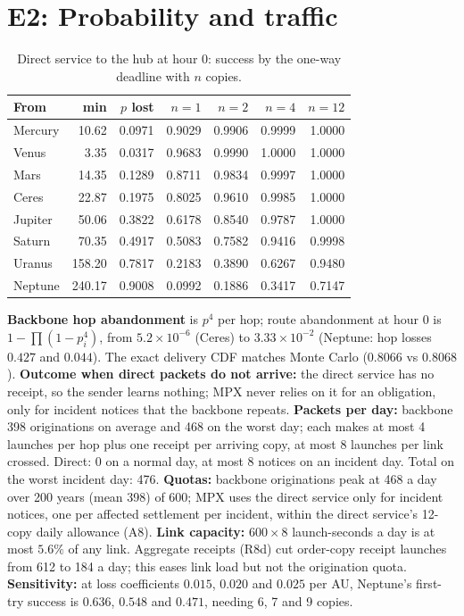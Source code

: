 \documentclass[11pt]{article}
\theoremstyle{definition}
\theoremstyle{remark}
\begin{document}
\section{E2: Probability and traffic}\label{app:e2}
\begin{table}[H]
\centering
\caption{Direct service to the hub at hour 0: success by the one-way deadline with $n$ copies.}
\small
\begin{tabular}{@{}lrrrrrr@{}}
\toprule
From & min & $p$ lost & $n{=}1$ & $n{=}2$ & $n{=}4$ & $n{=}12$ \\
\midrule
Mercury & 10.62 & 0.0971 & 0.9029 & 0.9906 & 0.9999 & 1.0000 \\
Venus & 3.35 & 0.0317 & 0.9683 & 0.9990 & 1.0000 & 1.0000 \\
Mars & 14.35 & 0.1289 & 0.8711 & 0.9834 & 0.9997 & 1.0000 \\
Ceres & 22.87 & 0.1975 & 0.8025 & 0.9610 & 0.9985 & 1.0000 \\
Jupiter & 50.06 & 0.3822 & 0.6178 & 0.8540 & 0.9787 & 1.0000 \\
Saturn & 70.35 & 0.4917 & 0.5083 & 0.7582 & 0.9416 & 0.9998 \\
Uranus & 158.20 & 0.7817 & 0.2183 & 0.3890 & 0.6267 & 0.9480 \\
Neptune & 240.17 & 0.9008 & 0.0992 & 0.1886 & 0.3417 & 0.7147 \\
\bottomrule
\end{tabular}
\end{table}
\textbf{Backbone hop abandonment} is $p^4$ per hop; route abandonment at hour 0 is $1-\prod(1-p_i^4)$, from $5.2\times10^{-6}$ (Ceres) to $3.33\times10^{-2}$ (Neptune: hop losses $0.427$ and $0.044$). The exact delivery CDF matches Monte Carlo ($0.8066$ vs $0.8068$). \textbf{Outcome when direct packets do not arrive:} the direct service has no receipt, so the sender learns nothing; MPX never relies on it for an obligation, only for incident notices that the backbone repeats. \textbf{Packets per day:} backbone 398 originations on average and 468 on the worst day; each makes at most 4 launches per hop plus one receipt per arriving copy, at most 8 launches per link crossed. Direct: 0 on a normal day, at most 8 notices on an incident day. Total on the worst incident day: 476. \textbf{Quotas:} backbone originations peak at 468 a day over 200 years (mean 398) of 600; MPX uses the direct service only for incident notices, one per affected settlement per incident, within the direct service's 12-copy daily allowance (A8). \textbf{Link capacity:} $600\times8$ launch-seconds a day is at most $5.6\%$ of any link. Aggregate receipts (R8d) cut order-copy receipt launches from 612 to 184 a day; this eases link load but not the origination quota. \textbf{Sensitivity:} at loss coefficients $0.015$, $0.020$ and $0.025$ per AU, Neptune's first-try success is $0.636$, $0.548$ and $0.471$, needing 6, 7 and 9 copies.
\end{document}
